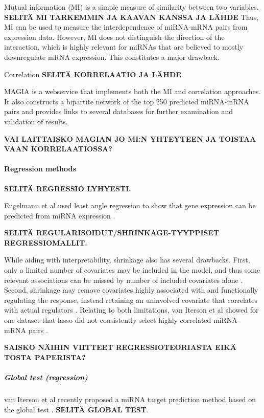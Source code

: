 Mutual information (MI) is a simple measure of similarity between two
variables. \textbf{SELITÄ MI TARKEMMIN JA KAAVAN KANSSA JA LÄHDE} Thus, MI can
be used to measure the interdependence of miRNA-mRNA pairs from expression
data. However, MI does not distinguish the direction of the interaction, which
is highly relevant for miRNAs that are believed to mostly downregulate mRNA
expression. This constitutes a major drawback.

Correlation \textbf{SELITÄ KORRELAATIO JA LÄHDE}.

MAGIA \citep{Sales2010} is a webservice that implements both the MI and
correlation approaches. It also constructs a bipartite network of the top 250
predicted miRNA-mRNA pairs and provides links to several databases for further
examination and validation of results.

\textbf{VAI LAITTAISKO MAGIAN JO MI:N YHTEYTEEN JA TOISTAA VAAN
KORRELAATIOSSA?}



\paragraph{Regression methods}\label{regression-methods}

\textbf{SELITÄ REGRESSIO LYHYESTI.}

Engelmann et al used least angle regression to show that gene expression can
be predicted from miRNA expression \citep{Engelmann}.

\textbf{SELITÄ REGULARISOIDUT/SHRINKAGE-TYYPPISET REGRESSIOMALLIT.}

While aiding with interpretability, shrinkage also has several drawbacks.
First, only a limited number of covariates may be included in the model, and
thus some relevant associations can be missed by number of included covariates
alone \citep{vanIterson2013}. Second, shrinkage may remove covariates highly
associated with and functionally regulating the response, instead retaining an
uninvolved covariate that correlates with actual regulators \citep{Engelmann}.
Relating to both limitations, van Iterson et al showed for one dataset that
lasso did not consistently select highly correlated miRNA-mRNA pairs
\citep{vanIterson2013}.

\textbf{SAISKO NÄIHIN VIITTEET REGRESSIOTEORIASTA EIKÄ TOSTA PAPERISTA?}


\subparagraph{Global test (regression)}\label{global-test-regression}

van Iterson et al recently proposed a miRNA target prediction method based on
the global test \citep{vanIterson2013}. \textbf{SELITÄ GLOBAL TEST}.

